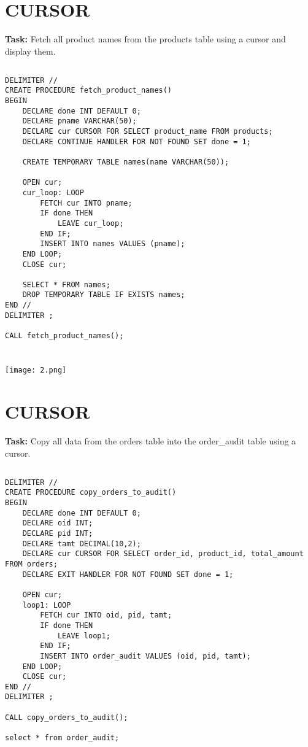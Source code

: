 \documentclass[12pt,a4paper]{article}
\begin{document}

\section{CURSOR}
\textbf{Task:} Fetch all product names from the products table using a cursor and display them.

\subsection{}
\begin{lstlisting}
DELIMITER //
CREATE PROCEDURE fetch_product_names()
BEGIN
    DECLARE done INT DEFAULT 0;
    DECLARE pname VARCHAR(50);
    DECLARE cur CURSOR FOR SELECT product_name FROM products;
    DECLARE CONTINUE HANDLER FOR NOT FOUND SET done = 1;

    CREATE TEMPORARY TABLE names(name VARCHAR(50));

    OPEN cur;
    cur_loop: LOOP
        FETCH cur INTO pname;
        IF done THEN
            LEAVE cur_loop;
        END IF;
        INSERT INTO names VALUES (pname);
    END LOOP;
    CLOSE cur;

    SELECT * FROM names;
    DROP TEMPORARY TABLE IF EXISTS names;
END //
DELIMITER ;

CALL fetch_product_names();


\end{lstlisting}

\subsubsection{}
\begin{center}
    \texttt{[image: 2.png]}
\end{center}


\section{CURSOR}
\textbf{Task:} Copy all data from the orders table into the order_audit table using a
cursor.

\subsection{}
\begin{lstlisting}
DELIMITER //
CREATE PROCEDURE copy_orders_to_audit()
BEGIN
    DECLARE done INT DEFAULT 0;
    DECLARE oid INT;
    DECLARE pid INT;
    DECLARE tamt DECIMAL(10,2);
    DECLARE cur CURSOR FOR SELECT order_id, product_id, total_amount FROM orders;
	DECLARE EXIT HANDLER FOR NOT FOUND SET done = 1;

    OPEN cur;
    loop1: LOOP
        FETCH cur INTO oid, pid, tamt;
        IF done THEN
            LEAVE loop1;
        END IF;
        INSERT INTO order_audit VALUES (oid, pid, tamt);
    END LOOP;
    CLOSE cur;
END //
DELIMITER ;

CALL copy_orders_to_audit();

select * from order_audit;

\end{lstlisting}
\end{document}
